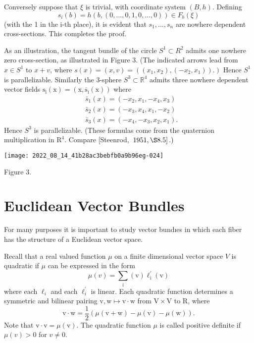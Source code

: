 \documentclass[10pt]{article}
\begin{document}
Conversely suppose that $\xi$ is trivial, with coordinate system $(B, h)$. Defining
$$
s_{i}(b)=h(b,(0, \ldots, 0,1,0, \ldots, 0)) \in F_{b}(\xi)
$$
(with the 1 in the i-th place), it is evident that $s_{1}, \ldots, s_{n}$ are nowhere dependent cross-sections. This completes the proof.

As an illustration, the tangent bundle of the circle $S^{1} \subset R^{2}$ admits one nowhere zero cross-section, as illustrated in Figure 3. (The indicated arrows lead from $x \in S^{1}$ to $x+v$, where $\left.s(x)=(x, v)=\left(\left(x_{1}, x_{2}\right),\left(-x_{2}, x_{1}\right)\right) .\right)$ Hence $S^{1}$ is parallelizable. Similarly the 3-sphere $S^{3} \subset \mathbb{R}^{4}$ admits three nowhere dependent vector fields $\mathrm{s}_{\mathrm{i}}(\mathrm{x})=\left(\mathrm{x}, \overline{\mathrm{s}}_{\mathrm{i}}(\mathrm{x})\right)$ where
$$
\begin{aligned}
&\bar{s}_{1}(x)=\left(-x_{2}, x_{1},-x_{4}, x_{3}\right) \\
&\bar{s}_{2}(x)=\left(-x_{3}, x_{4}, x_{1},-x_{2}\right) \\
&\bar{s}_{3}(x)=\left(-x_{4},-x_{3}, x_{2}, x_{1}\right) .
\end{aligned}
$$
Hence $S^{3}$ is parallelizable. (These formulas come from the quaternion multiplication in $\mathrm{R}^{4}$. Compare [Steenrod, $\left.\left.1951, \S 8.5\right] .\right)$

\texttt{[image: 2022\_08\_14\_41b28ac3bebfb0a9b96eg-024]}

Figure $3 .$

\section{Euclidean Vector Bundles}
For many purposes it is important to study vector bundıes in which each fiber has the structure of a Euclidean vector space.

Recall that a real valued function $\mu$ on a finite dimensional vector space $V$ is quadratic if $\mu$ can be expressed in the form
$$
\mu(v)=\sum_{\mathrm{i}}(\mathrm{v}) \ell_{\mathrm{i}}^{\prime}(\mathrm{v})
$$
where each $\ell_{i}$ and each $\ell_{i}^{\prime}$ is linear. Each quadratic function determines a symmetric and bilinear pairing $\mathrm{v}, \mathrm{w} \mapsto \mathrm{v} \cdot \mathrm{w}$ from $\mathrm{V} \times \mathrm{V}$ to $\mathrm{R}$, where
$$
\mathrm{v} \cdot \mathrm{w}=\frac{1}{2}(\mu(\mathrm{v}+\mathrm{w})-\mu(\mathrm{v})-\mu(\mathrm{w})) .
$$
Note that $\mathrm{v} \cdot \mathrm{v}=\mu(\mathrm{v})$. The quadratic function $\mu$ is called positive definite if $\mu(v)>0$ for $v \neq 0$.
\end{document}
